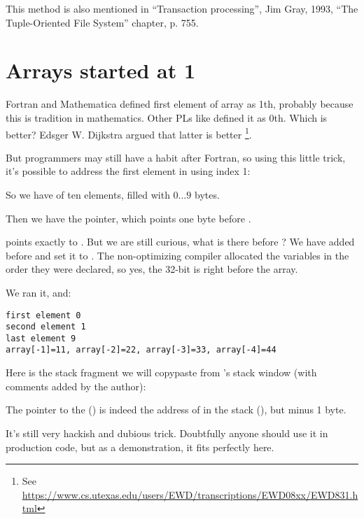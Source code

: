 This method is also mentioned in ``Transaction processing'', Jim Gray, 1993,
``The Tuple-Oriented File System'' chapter, p. 755.

\section{Arrays started at 1}

Fortran and Mathematica defined first element of array as 1th, probably because this is tradition in mathematics.
Other \ac{PL}s like \CCpp defined it as 0th.
Which is better?
Edsger W. Dijkstra argued that latter is better
\footnote{See \url{https://www.cs.utexas.edu/users/EWD/transcriptions/EWD08xx/EWD831.html}}.

But programmers may still have a habit after Fortran, so using this little trick, it's possible to address the first element
in \CCpp using index 1:





So we have  of ten elements, filled with $0 \ldots 9$ bytes.

Then we have the  pointer, which points one byte before .

 points exactly to .
But we are still curious, what is there before ?
We have added  before  and set 
it to .
The non-optimizing compiler allocated the variables in the order they were declared, so yes, the 32-bit 
is right before the array.

We ran it, and:

\begin{lstlisting}
first element 0
second element 1
last element 9
array[-1]=11, array[-2]=22, array[-3]=33, array[-4]=44
\end{lstlisting}

Here is the stack fragment we will copypaste from \olly's stack window (with comments added by the author):



The pointer to the  () is indeed 
the address of  in the stack (), 
but minus 1 byte.

It's still very hackish and dubious trick. Doubtfully anyone should use it in production code,
but as a demonstration, it fits perfectly here.



